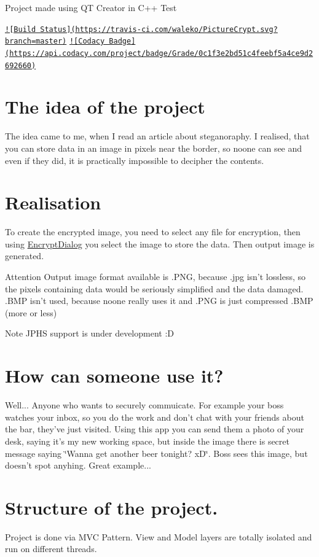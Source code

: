 Project made using Q\-T Creator in C++ Test 

\href{https://travis-ci.com/waleko/PictureCrypt}{\tt !\mbox{[}Build Status\mbox{]}(https\-://travis-\/ci.\-com/waleko/\-Picture\-Crypt.\-svg?branch=master)} \href{https://app.codacy.com/app/waleko/PictureCrypt?utm_source=github.com&utm_medium=referral&utm_content=waleko/PictureCrypt&utm_campaign=Badge_Grade_Dashboard}{\tt !\mbox{[}Codacy Badge\mbox{]}(https\-://api.\-codacy.\-com/project/badge/\-Grade/0c1f3e2bd51c4feebf5a4ce9d2692660)}\hypertarget{index_idea}{}\section{The idea of the project}\label{index_idea}
The idea came to me, when I read an article about steganoraphy. I realised, that you can store data in an image in pixels near the border, so noone can see and even if they did, it is practically impossible to decipher the contents. \hypertarget{index_real}{}\section{Realisation}\label{index_real}
To create the encrypted image, you need to select any file for encryption, then using \hyperlink{class_encrypt_dialog}{Encrypt\-Dialog} you select the image to store the data. Then output image is generated. \begin{DoxyAttention}{Attention}
Output image format available is .P\-N\-G, because .jpg isn't lossless, so the pixels containing data would be seriously simplified and the data damaged. .B\-M\-P isn't used, because noone really uses it and .P\-N\-G is just compressed .B\-M\-P (more or less) 
\end{DoxyAttention}
\begin{DoxyNote}{Note}
J\-P\-H\-S support is under development \-:D
\end{DoxyNote}
\hypertarget{index_use}{}\section{How can someone use it?}\label{index_use}
Well... Anyone who wants to securely commuicate. For example your boss watches your inbox, so you do the work and don't chat with your friends about the bar, they've just visited. Using this app you can send them a photo of your desk, saying it's my new working space, but inside the image there is secret message saying \char`\"{}\-Wanna get another beer tonight? x\-D\char`\"{}. Boss sees this image, but doesn't spot anyhing. Great example... \hypertarget{index_structure}{}\section{Structure of the project.}\label{index_structure}
Project is done via M\-V\-C Pattern. View and Model layers are totally isolated and run on different threads.

